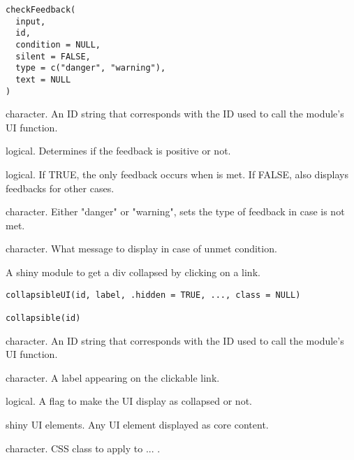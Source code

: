 \documentclass[letterpaper]{book}
\begin{document}
%
\begin{Usage}
\begin{verbatim}
checkFeedback(
  input,
  id,
  condition = NULL,
  silent = FALSE,
  type = c("danger", "warning"),
  text = NULL
)
\end{verbatim}
\end{Usage}
%
\begin{Arguments}
\begin{ldescription}
\item[\code{id}] character. An ID string that corresponds with the ID used to call
the module's UI function.

\item[\code{condition}] logical. Determines if the feedback is positive or not.

\item[\code{silent}] logical. If TRUE, the only feedback occurs when  is
met. If FALSE, also displays feedbacks for other cases.

\item[\code{type}] character. Either "danger" or "warning", sets the type of
feedback in case  is not met.

\item[\code{text}] character. What message to display in case of unmet condition.
\end{ldescription}
\end{Arguments}
%
\begin{Description}\relax
A shiny module to get a div collapsed by clicking on a link.
\end{Description}
%
\begin{Usage}
\begin{verbatim}
collapsibleUI(id, label, .hidden = TRUE, ..., class = NULL)

collapsible(id)
\end{verbatim}
\end{Usage}
%
\begin{Arguments}
\begin{ldescription}
\item[\code{id}] character. An ID string that corresponds with the ID used to call
the module's UI function.

\item[\code{label}] character. A label appearing on the clickable link.

\item[\code{.hidden}] logical. A flag to make the UI display as collapsed or not.

\item[\code{...}] shiny UI elements. Any UI element displayed as core content.

\item[\code{class}] character. CSS class to apply to ... .
\end{ldescription}
\end{Arguments}
\end{document}
